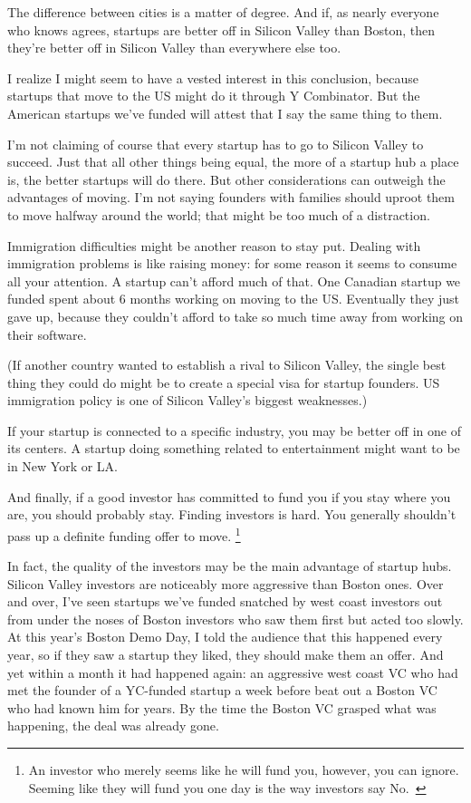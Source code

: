 \documentclass[12pt]{book}
\begin{document}
The difference between cities is a matter of degree. And if, as nearly
everyone who knows agrees, startups are better off in Silicon Valley
than Boston, then they're better off in Silicon Valley than everywhere
else too.

I realize I might seem to have a vested interest in this conclusion,
because startups that move to the US might do it through Y Combinator.
But the American startups we've funded will attest that I say the same
thing to them.

I'm not claiming of course that every startup has to go to Silicon
Valley to succeed. Just that all other things being equal, the more of a
startup hub a place is, the better startups will do there. But other
considerations can outweigh the advantages of moving. I'm not saying
founders with families should uproot them to move halfway around the
world; that might be too much of a distraction.

Immigration difficulties might be another reason to stay put. Dealing
with immigration problems is like raising money: for some reason it
seems to consume all your attention. A startup can't afford much of
that. One Canadian startup we funded spent about 6 months working on
moving to the US. Eventually they just gave up, because they couldn't
afford to take so much time away from working on their software.

(If another country wanted to establish a rival to Silicon Valley, the
single best thing they could do might be to create a special visa for
startup founders. US immigration policy is one of Silicon Valley's
biggest weaknesses.)

If your startup is connected to a specific industry, you may be better
off in one of its centers. A startup doing something related to
entertainment might want to be in New York or LA.

And finally, if a good investor has committed to fund you if you stay
where you are, you should probably stay. Finding investors is hard. You
generally shouldn't pass up a definite funding offer to move.
\footnote{An investor who merely seems like he will fund you, however, you
can ignore. Seeming like they will fund you one day is the way investors
say No.~}

In fact, the quality of the investors may be the main advantage of
startup hubs. Silicon Valley investors are noticeably more aggressive
than Boston ones. Over and over, I've seen startups we've funded
snatched by west coast investors out from under the noses of Boston
investors who saw them first but acted too slowly. At this year's Boston
Demo Day, I told the audience that this happened every year, so if they
saw a startup they liked, they should make them an offer. And yet within
a month it had happened again: an aggressive west coast VC who had met
the founder of a YC-funded startup a week before beat out a Boston VC
who had known him for years. By the time the Boston VC grasped what was
happening, the deal was already gone.
\end{document}
